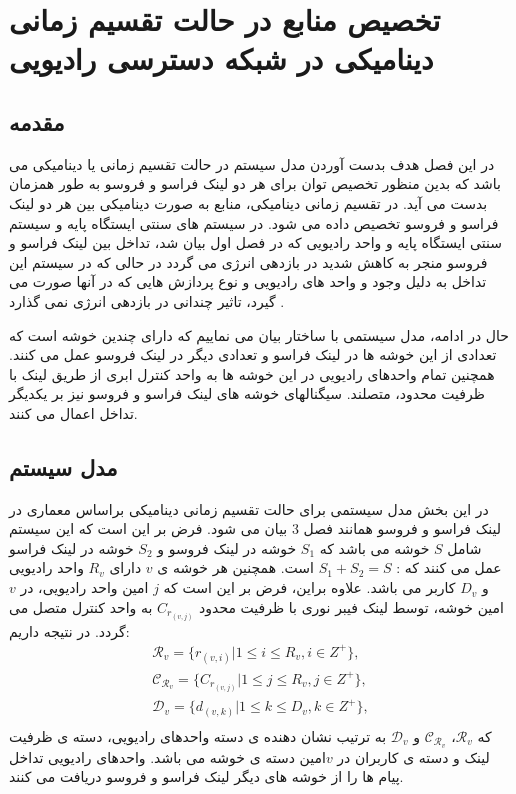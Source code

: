 \chapter{تخصیص منابع در حالت تقسیم زمانی دینامیکی در شبکه دسترسی رادیویی}
\section{مقدمه}
در این فصل هدف بدست آوردن مدل سیستم در حالت تقسیم زمانی یا   دینامیکی می باشد که بدین منظور تخصیص توان برای هر دو لینک فراسو و فروسو به طور همزمان بدست می آید.
در تقسیم زمانی دینامیکی، منابع به صورت دینامیکی بین هر دو لینک فراسو و فروسو  تخصیص داده می شود. در سیستم های سنتی  ایستگاه پایه و سیستم سنتی ایستگاه پایه و واحد رادیویی که در فصل اول بیان شد، تداخل بین لینک فراسو و فروسو منجر به کاهش شدید در بازدهی انرژی می گردد در حالی که در سیستم  این تداخل  به دلیل وجود  و واحد های رادیویی  و نوع پردازش هایی که در آنها صورت می گیرد، تاثیر چندانی در بازدهی انرژی نمی گذارد \cite{TDD,dynamic}.


حال در ادامه، مدل سیستمی با ساختار   بیان می نماییم که دارای چندین خوشه است که تعدادی از این خوشه  ها در لینک فراسو و تعدادی دیگر در لینک فروسو عمل می کنند. همچنین تمام واحدهای رادیویی در این خوشه ها به واحد کنترل ابری  از طریق لینک  با ظرفیت محدود، متصلند. سیگنالهای خوشه های لینک فراسو و فروسو نیز بر یکدیگر تداخل اعمال می کنند.
\section{مدل سیستم}
در این بخش مدل سیستمی برای حالت تقسیم زمانی دینامیکی  براساس معماری  در لینک فراسو و فروسو همانند فصل 3 بیان می شود. فرض بر این است که این سیستم شامل $S$ خوشه می باشد که $S_1$ خوشه در لینک فروسو و $S_2$
 خوشه در لینک فراسو عمل می کنند که :
 $S_1 + S_2 = S$
 است.
 همچنین هر خوشه ی $v$ دارای  $R_v$  واحد رادیویی و $D_v$ کاربر می باشد.  
 علاوه براین، فرض بر این است که
$j$
امین واحد رادیویی، در $v$امین خوشه، توسط لینک فیبر نوری با ظرفیت محدود $C_{r_{(v,j)}}$ به واحد کنترل متصل می گردد. در نتیجه داریم:
\begin{equation}
\begin{split}
\mathcal{R}_v= \{  r_{(v,i)} | 1 \leq i \leq {R}_v , i\in Z^+\}, \\
\mathcal{C}_{\mathcal{R}_v}= \{C_{r_{(v,j)}}| 1 \leq j \leq {R}_v , j\in Z^+\}, \\
\mathcal{D}_v= \{  d_{(v,k)} | 1 \leq k \leq {D}_v , k\in Z^+\},  \\
\end{split}
\end{equation} 
که
 $\mathcal{R}_v$، $\mathcal{C}_{\mathcal{R}_v}$
 و
  $\mathcal{D}_v$
 به ترتیب نشان دهنده ی دسته واحدهای رادیویی، دسته ی ظرفیت لینک  و دسته ی کاربران در $v$امین دسته ی خوشه می باشد.\newline
واحدهای رادیویی
 تداخل پیام ها را از خوشه های دیگر لینک فراسو و فروسو دریافت می کنند.
\newline
